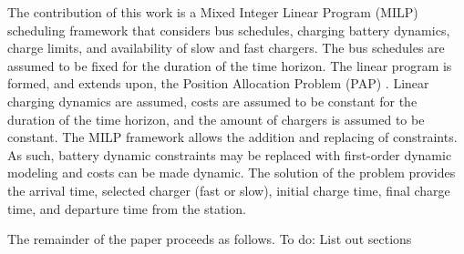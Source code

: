 \documentclass[letterpaper, 10pt, conference]{IEEEtran}
\newcommand{\TODO}[1]{{\color{green} To do: #1}} %
\begin{document}
The contribution of this work is a Mixed Integer Linear Program (MILP) scheduling framework that considers bus schedules, charging battery dynamics, charge limits, and availability of slow and fast chargers. The bus schedules are assumed to be fixed for the duration of the time horizon. The linear program is formed, and extends upon, the Position Allocation Problem (PAP) \cite{Qarebagh2019}. Linear charging dynamics are assumed, costs are assumed to be constant for the duration of the time horizon, and the amount of chargers is assumed to be constant. The MILP framework allows the addition and replacing of constraints. As such, battery dynamic constraints may be replaced with first-order dynamic modeling and costs can be made dynamic. The solution of the problem provides the arrival time, selected charger (fast or slow), initial charge time, final charge time, and departure time from the station.

The remainder of the paper proceeds as follows. \TODO{List out sections}
\end{document}
